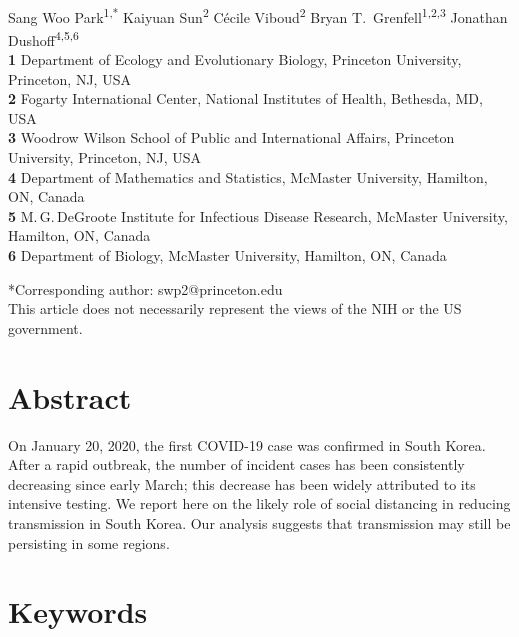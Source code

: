 \documentclass[12pt]{article}
\date{\today}
\begin{document}
\begin{flushleft}{
	\Large
	\textbf{}
}
\newline
\\
Sang Woo Park\textsuperscript{1,*}
Kaiyuan Sun\textsuperscript{2}
C\'ecile Viboud\textsuperscript{2}
Bryan T.\ Grenfell\textsuperscript{1,2,3}
Jonathan Dushoff\textsuperscript{4,5,6}
\\
\bigskip
\textbf{1} Department of Ecology and Evolutionary Biology, Princeton University, Princeton, NJ, USA
\\
\textbf{2} Fogarty International Center, National Institutes of Health, Bethesda, MD, USA
\\
\textbf{3} Woodrow Wilson School of Public and International Affairs, Princeton University, Princeton, NJ, USA
\\
\textbf{4} Department of Mathematics and Statistics, McMaster University, Hamilton, ON, Canada
\\
\textbf{5} M.\,G.\,DeGroote Institute for Infectious Disease Research, McMaster University, Hamilton, ON, Canada
\\
\textbf{6} Department of Biology, McMaster University, Hamilton, ON, Canada
\\
\bigskip

*Corresponding author: swp2@princeton.edu\\
This article does not necessarily represent the views of the NIH or the US government.
\end{flushleft}

\section*{Abstract}

On January 20, 2020, the first COVID-19 case was confirmed in South Korea.
After a rapid outbreak, the number of incident cases has been consistently decreasing since early March;
this decrease has been widely attributed to its intensive testing.
We report here on the likely role of social distancing in reducing transmission in South Korea.
Our analysis suggests that transmission may still be persisting in some regions.

\section*{Keywords}
\end{document}
